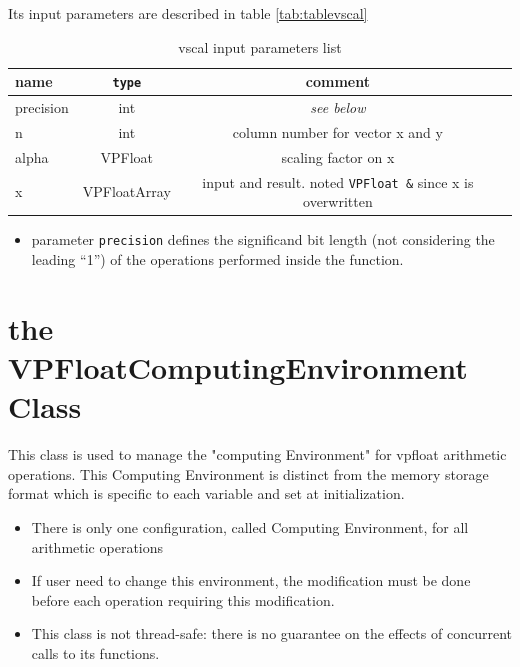 \documentclass[11pt]{report}
\begin{document}
Its input parameters are described in table \ref{tab:tablevscal}
\begin{table}[h!]
  \begin{center}
    \caption{vscal input parameters list}
    \label{tab:tablevdot}
    \begin{tabular}{l|c|c|r} %
      \textbf{name} & \texttt{type} & \textbf{comment}\\
      \hline
      precision & int & \emph{see below} \\ 
      \hline
      n & int & column number for vector x and y \\ 
      \hline
      alpha & VPFloat & scaling factor on x \\ 
      \hline
      x & VPFloatArray & input and result. noted \texttt{VPFloat \&} since x is overwritten \\ 
      \hline
    \end{tabular}
  \end{center}
\end{table}
\begin{itemize}
\item parameter \texttt{precision} defines the significand bit length (not considering the leading ``1'') of the operations performed inside the function. 
  \end{itemize}

\chapter{the VPFloatComputingEnvironment Class}
This class is used to manage the "computing Environment" for vpfloat arithmetic operations. This Computing Environment is distinct from the memory storage format which is specific to each variable and set at initialization. 

\begin{itemize}
\item There is only one configuration, called Computing Environment,  for all arithmetic operations
  \item If user need to change 
    this environment, the modification must be done before each operation requiring this modification.
    \item This class is not thread-safe: there is no guarantee on the effects of concurrent calls to its functions.
    \end{itemize}
\end{document}
